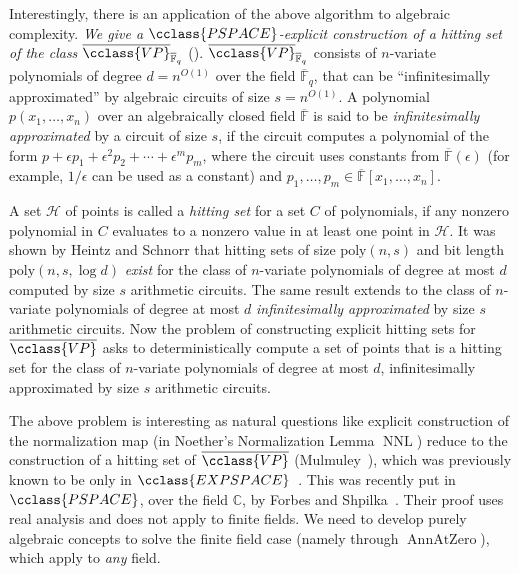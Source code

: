 \documentclass{toc}
\newcommand{\F}{\mathbb{F}}
\newcommand{\ol}[1]{\overline{#1}}
\newcommand{\PSPACE}{\cclass{PSPACE}\xspace}  %
\newcommand{\EXPSPACE}{\cclass{EXPSPACE}\xspace} %
\newcommand{\VP}{\cclass{VP}\xspace}  %
\newcommand{\VPbar}{\overline{\VP}\xspace}  %
\DeclareMathOperator{\AnnAtZero}{\mathrm{AnnAtZero}\xspace} %
\DeclareMathOperator{\NNL}{\mathrm{NNL}\xspace} %
\begin{document}
Interestingly, there is an
%
%
application of the above algorithm to algebraic complexity.  %
\emph{We give a $\PSPACE$-explicit construction of a
%
hitting set    %
of the class
%
$\VPbar_{\ol{\F}_q}$}    %
().
%
$\VPbar_{\ol{\F}_q}$    %
consists of $n$-variate
%
%
polynomials of degree $d=n^{O(1)}$ over
the field $\ol{\F}_q$, that can be ``infinitesimally approximated'' by
%
%
algebraic circuits of size $s=n^{O(1)}$.
A polynomial $p(x_1,\ldots,x_n)$ over an algebraically closed field $\ol{\F}$ is said to be \emph{infinitesimally approximated} by a circuit of size $s$, if the circuit computes a polynomial of the form $p+\epsilon p_1+\epsilon^2 p_2+\cdots+\epsilon^m p_m$, where the circuit uses constants from $\ol{\F}(\epsilon)$ (for example, ${1}/{\epsilon}$ can be used as a constant) and $p_1,\ldots,p_m \in \ol{\F}[x_1,\ldots,x_n]$.

%
A set $\mathcal{H}$ of points   %
is called a
%
\emph{hitting set}    %
for a
%
set $C$ of polynomials,   %
if any nonzero polynomial in $C$ evaluates to a nonzero value in at least one point in $\mathcal{H}$. 
It was shown by  %
Heintz and Schnorr   %
\cite{heintz1980testing} that
%
hitting sets  %
of size $\mathrm{poly}(n, s)$ and bit length $\mathrm{poly}(n, s,\log d)$
\emph{exist} for the class of $n$-variate polynomials of degree
at most $d$ computed by size $s$ arithmetic circuits.
The same result extends to  
the class of $n$-variate polynomials of degree at most $d$ \emph{infinitesimally approximated} by size $s$ arithmetic circuits. Now the
%
%
problem of constructing explicit hitting sets  %
for
%
$\VPbar$    %
asks to
%
%
%
deterministically compute a   %
%
set of points that is a hitting set for the class of $n$-variate polynomials of degree at most $d$, infinitesimally approximated by size $s$ arithmetic circuits.
%

The above problem is interesting as natural questions like explicit construction of the normalization map (in Noether's Normalization Lemma $\NNL$) reduce to the construction of a hitting set of
%
$\VPbar$    %
%
(Mulmuley~\cite{mulmuley2017geometric}), %
%
which was previously known to be only in
%
$\EXPSPACE$~\cite{mulmuley2017geometric,mul12}. 
This was recently put in $\PSPACE$, over the field $\mathbb{C}$,
by  %
Forbes and Shpilka~\cite{forbes2017pspace}.
Their proof
%
uses real analysis and does not apply to finite fields. We need to develop purely algebraic concepts to solve the finite field case (namely through $\AnnAtZero$), which apply to \emph{any} field.
%
%
%
%
\end{document}

